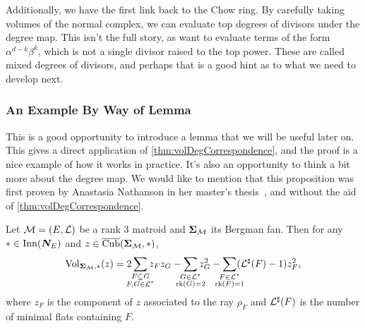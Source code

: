 \documentclass[12pt,oneside]{../../sfsuthesis}
\begin{document}
Additionally, we have the first link back to the Chow ring.
By carefully taking volumes of the normal complex, we can evaluate top degrees of divisors under the degree map.
This isn't the full story, as want to evaluate terms of the form \( \alpha^{d-k}\beta^k \), which is not a single divisor raised to the top power.
These are called mixed degrees of divisors, and perhaps that is a good hint as to what we need to develop next.

\subsubsection{An Example By Way of Lemma}

This is a good opportunity to introduce a lemma that we will be useful later on.
This gives a direct application of \th\ref{thm:volDegCorrespondence}, and the proof is a nice example of how it works in practice.
It's also an opportunity to think a bit more about the degree map.
We would like to mention that this proposition was first proven by Anastasia Nathanson in her master's thesis~\cite{nathansonGeometricVolumeRank2021}, and without the aid of \th\ref{thm:volDegCorrespondence}.
\begin{lemma}\th\label{thm:volRank3}
    Let \( \mathcal{M}=(E,\mathcal{L}) \) be a rank 3 matroid and \( {\bm{\Sigma}}_{\mathcal{M}}  \) its Bergman fan.
    Then for any \( \ast \in \mathrm{Inn}(\bm{N}_E) \) and \( z \in \operatorname{\overline{Cub}}({\bm{\Sigma}}_{\mathcal{M}}, \ast) \),
    \[
        \Vol_{\bSigma_\cM, \ast}(z) =  2\sum_{\mathclap{\substack{F \subsetneq G \\ F,G \in \cL^\ast}}} z_F z_G - \sum_{\mathclap{\substack{G \in \cL^\ast \\ \rk(G)=2}}} z_G^2 - \sum_{\mathclap{\substack{F \in \cL^\ast \\ \rk(F)=1}}}(\cL^\sharp(F) - 1)z_F^2,
    \]
    where \( z_F \) is the component of \( z \) associated to the ray \( \rho_F \) and \( \mathcal{L}^\sharp(F) \) is the number of minimal flats containing \( F \).
\end{lemma}
\end{document}
